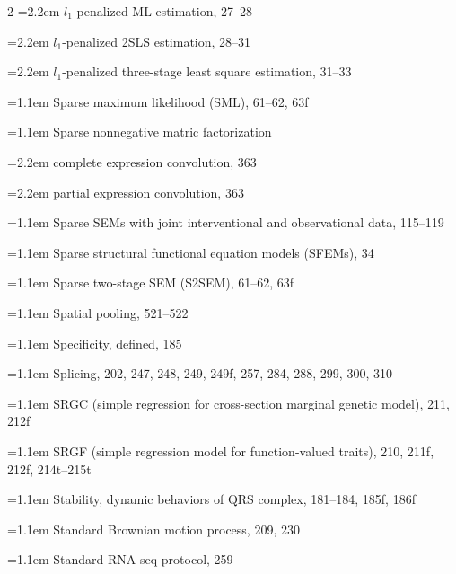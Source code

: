 \begin{multicols}{2}
\noindent\hangindent=2.2em \hspace*{1.1em}$l_{1}$-penalized ML estimation, 27--28\par
\noindent\hangindent=2.2em \hspace*{1.1em}$l_{1}$-penalized 2SLS estimation, 28--31\par
\noindent\hangindent=2.2em \hspace*{1.1em}$l_{1}$-penalized three-stage least square estimation, 31--33\par
\noindent\hangindent=1.1em Sparse maximum likelihood (SML), 61--62, 63f\par
\noindent\hangindent=1.1em Sparse nonnegative matric factorization\par
\noindent\hangindent=2.2em \hspace*{1.1em}complete expression convolution, 363\par
\noindent\hangindent=2.2em \hspace*{1.1em}partial expression convolution, 363\par
\noindent\hangindent=1.1em Sparse SEMs with joint interventional and observational data, 115--119\par
\noindent\hangindent=1.1em Sparse structural functional equation models (SFEMs), 34\par
\noindent\hangindent=1.1em Sparse two-stage SEM (S2SEM), 61--62, 63f\par
\noindent\hangindent=1.1em Spatial pooling, 521--522\par
\noindent\hangindent=1.1em Specificity, defined, 185\par
\noindent\hangindent=1.1em Splicing, 202, 247, 248, 249, 249f, 257, 284, 288, 299, 300, 310\par
\noindent\hangindent=1.1em SRGC (simple regression for cross-section marginal genetic model), 211, 212f\par
\noindent\hangindent=1.1em SRGF (simple regression model for function-valued traits), 210, 211f, 212f, 214t--215t\par
\noindent\hangindent=1.1em Stability, dynamic behaviors of QRS complex, 181--184, 185f, 186f\par
\noindent\hangindent=1.1em Standard Brownian motion process, 209, 230\par
\noindent\hangindent=1.1em Standard RNA-seq protocol, 259\par

\end{multicols}
